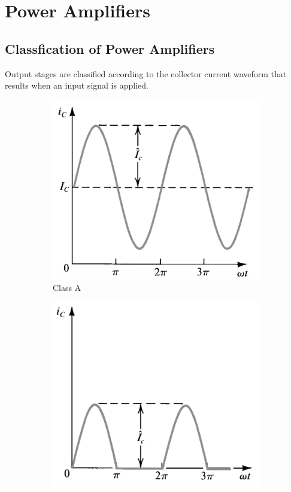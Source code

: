 \chapter{Power Amplifiers}

\section{Classfication of Power Amplifiers}

Output stages are classified according to the collector current waveform that results when an input signal is applied.

\begin{figure}[H]
  \centering
  \begin{subfigure}{.4\textwidth}
    \centering
    \includegraphics[width=\linewidth]{figures/Power-A}
    \caption{Class A}
  \end{subfigure}
  \begin{subfigure}{.4\textwidth}
    \centering
    \includegraphics[width=\linewidth]{figures/Power-B}

\end{subfigure}
\end{figure}
